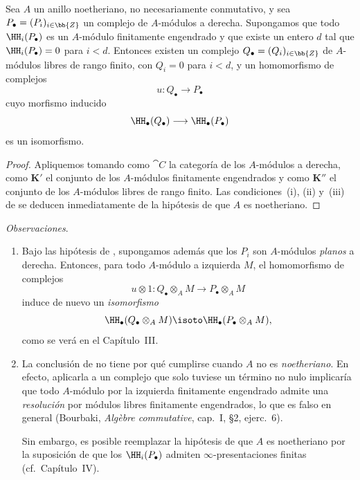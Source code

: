\documentclass[oneside]{amsart}
\let\EGAOriginalLabel\label
\renewcommand{\label}[1]{\phantomsection\EGAOriginalLabel{#1}}
\begin{document}
\begin{corollary}[11.9.2]
\label{0.11.9.2}
Sea $A$ un anillo noetheriano, no necesariamente conmutativo, y sea
$P_\bullet=(P_i)_{i\in\bb{Z}}$ un complejo de $A$-módulos a derecha.
Supongamos que todo $\HH_i(P_\bullet)$ es un $A$-módulo finitamente
engendrado y que existe un entero $d$ tal que
$\HH_i(P_\bullet)=0$ para $i<d$.
Entonces existen un complejo $Q_\bullet=(Q_i)_{i\in\bb{Z}}$ de
$A$-módulos libres de rango finito, con $Q_i=0$ para $i<d$, y un homomorfismo
de complejos
\[
  u:Q_\bullet\longrightarrow P_\bullet
\]
cuyo morfismo inducido
\[
  \HH_\bullet(Q_\bullet)\longrightarrow\HH_\bullet(P_\bullet)
\]
es un isomorfismo.
\end{corollary}

\begin{proof}
Apliquemos  tomando como $\cat{C}$ la categoría de los
$A$-módulos a derecha, como $\boldsymbol K'$ el conjunto de los $A$-módulos finitamente engendrados y
como $\boldsymbol K''$ el conjunto de los $A$-módulos libres de rango finito.
Las condiciones~(i), (ii) y~(iii) de  se deducen inmediatamente
de la hipótesis de que $A$ es noetheriano.
\end{proof}

\begin{env}[11.9.3]
\label{0.11.9.3}
\emph{Observaciones}.
\begin{enumerate}
  \item[{\rm(i)}]
  Bajo las hipótesis de , supongamos además que los
  $P_i$ son $A$-módulos \emph{planos} a derecha.
  Entonces, para todo $A$-módulo a izquierda $M$, el homomorfismo de complejos
  \[
    u\otimes 1:
    Q_\bullet\otimes_A M
    \longrightarrow
    P_\bullet\otimes_A M
  \]
  induce de nuevo un \emph{isomorfismo}
  \[
    \HH_\bullet(Q_\bullet\otimes_A M)
    \isoto
    \HH_\bullet(P_\bullet\otimes_A M),
  \]
  como se verá en el Capítulo~III.

  \item[{\rm(ii)}]
  La conclusión de  no tiene por qué cumplirse cuando $A$ no es
  \emph{noetheriano}.
  En efecto, aplicarla a un complejo que solo tuviese un término no nulo
  implicaría que todo $A$-módulo por la izquierda finitamente engendrado admite una \emph{resolución} por
  módulos libres finitamente engendrados, lo que es falso en general
(Bourbaki, \emph{Alg\`ebre commutative}, cap.~I, \S2, ejerc.~6).

  Sin embargo, es posible reemplazar la hipótesis de que $A$ es
  noetheriano por la suposición de que los $\HH_i(P_\bullet)$ admiten
  $\infty$-presentaciones finitas (cf.\ Capítulo~IV).
\end{enumerate}
\end{env}
\end{document}
